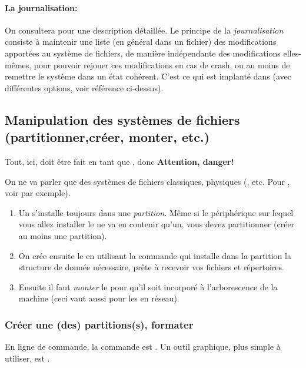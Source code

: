 \paragraph{La journalisation:} On consultera \cite{journ} pour une
description détaillée.
Le principe de la \emph{journalisation} consiste à maintenir une liste
(en général dans un fichier) des modifications apportées au système de
fichiers, de manière indépendante des modifications elles-mêmes, pour
pouvoir rejouer ces modifications en cas de crash, ou au moins de
remettre le système dans un état cohérent. C'est ce qui est implanté
dans  (avec différentes options, voir référence ci-dessus).  

\subsection{Manipulation des systèmes de fichiers (partitionner,créer, monter,
  etc.)}
Tout, ici, doit être fait en tant que , donc 
\textdbend \textbf{Attention, danger!}

On ne va parler que des systèmes de fichiers classiques, physiques
(,  etc. Pour , voir par
exemple\cite{btrfs}).

\begin{enumerate}
\item Un \sff{} s'installe toujours dans une \emph{partition.} Même si
  le périphérique sur lequel vous allez installer le \sff{} ne va
  en contenir qu'un, vous devez partitionner (créer au moins une partition).
\item On crée ensuite le \sff{} en utilisant la commande 
  qui installe dans la partition la structure de donnée nécessaire,
  prête à recevoir vos fichiers et répertoires.
\item Ensuite il faut \emph{monter} le \sff{} pour qu'il soit
  incorporé à l'arborescence de la machine (ceci vaut aussi pour les
  \sff{} en réseau).
\end{enumerate}
\subsubsection{Créer une (des) partitions(s), formater}
En ligne de commande, la commande est . Un outil graphique,
plus simple à utiliser, est .


